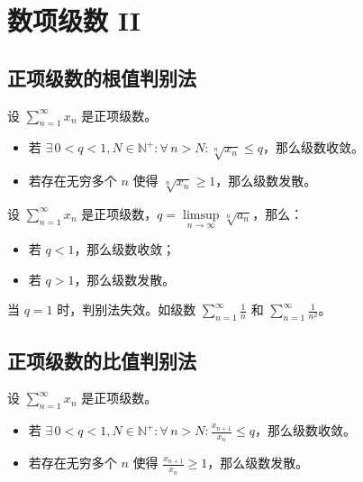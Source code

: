\section{数项级数 II}

\subsection{正项级数的根值判别法}

\begin{theorem}
    设 $\sum\limits_{n = 1}^{\infty} x_n$ 是正项级数。
    \begin{itemize}
        \item 若 $\exists\,0 < q < 1, N \in \mathbb{N}^{+}: \forall\,n > N: \sqrt[n]{x_n} \le q$，那么级数收敛。
        \item 若存在无穷多个 $n$ 使得 $\sqrt[n]{x_n} \ge 1$，那么级数发散。
    \end{itemize}
\end{theorem}

\begin{theorem}
    设 $\sum\limits_{n = 1}^{\infty} x_n$ 是正项级数，$q = \limsup\limits_{n \to \infty} \sqrt[n]{a_n}$，那么：
    \begin{itemize}
        \item 若 $q < 1$，那么级数收敛；
        \item 若 $q > 1$，那么级数发散。
    \end{itemize}
\end{theorem}

\begin{remark}
    当 $q = 1$ 时，判别法失效。如级数 $\sum\limits_{n = 1}^{\infty} \frac{1}{n}$ 和 $\sum\limits_{n = 1}^{\infty} \frac{1}{n^2}$。
\end{remark}

\subsection{正项级数的比值判别法}

\begin{theorem}
    设 $\sum\limits_{n = 1}^{\infty} x_n$ 是正项级数。
    \begin{itemize}
        \item 若 $\exists\,0 < q < 1, N \in \mathbb{N}^{+}: \forall\,n > N: \frac{x_{n + 1}}{x_n} \le q$，那么级数收敛。
        \item 若存在无穷多个 $n$ 使得 $\frac{x_{n + 1}}{x_n} \ge 1$，那么级数发散。
    \end{itemize}
\end{theorem}

